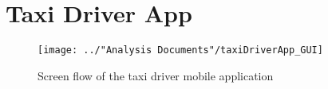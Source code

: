 \section{Taxi Driver App}
\begin{figure}[H]
	\centering
	\texttt{[image: ../"Analysis Documents"/taxiDriverApp\_GUI]}
	\caption{Screen flow of the taxi driver mobile application}
	\label{fig:screenFlow:taxiDriverApp}
\end{figure}